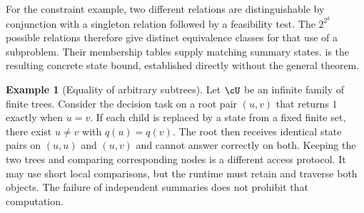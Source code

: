\documentclass[11pt,twoside]{article}
\theoremstyle{definition}
\newtheorem{example}[theorem]{Example}
\theoremstyle{remark}
\begin{document}
For the constraint example, two different relations are distinguishable
by conjunction with a singleton relation followed by a feasibility test.
The $2^{2^k}$ possible relations therefore give distinct equivalence
classes for that use of a subproblem. Their membership tables supply
matching summary states.  is the resulting concrete
state bound, established directly without the general theorem.

\begin{example}[Equality of arbitrary subtrees]
Let $\cU$ be an infinite family of finite trees. Consider the decision
task on a root pair $(u,v)$ that returns $1$ exactly when $u=v$.
If each child is replaced by a state from a fixed finite set, there exist
$u\ne v$ with $q(u)=q(v)$. The root then receives identical state pairs on
$(u,u)$ and $(u,v)$ and cannot answer correctly on both.
Keeping the two trees and comparing corresponding nodes is a different
access protocol. It may use short local comparisons, but the runtime must
retain and traverse both objects. The failure of independent summaries
does not prohibit that computation.
\end{example}
\end{document}
